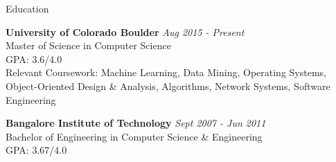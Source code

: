 
\begin{rSection}{Education}

{\bf University of Colorado Boulder} \hfill {\em Aug 2015 - Present}
\\ \hfill Master of Science in Computer Science
\\ GPA: 3.6/4.0
\\ Relevant Coursework: Machine Learning, Data Mining, Operating Systems, Object-Oriented Design \& Analysis, Algorithms, Network Systems, Software Engineering

{\bf Bangalore Institute of Technology} \hfill {\em Sept 2007 - Jun 2011}
\\ \hfill Bachelor of Engineering in Computer Science \& Engineering
\\ GPA: 3.67/4.0

\end{rSection}
